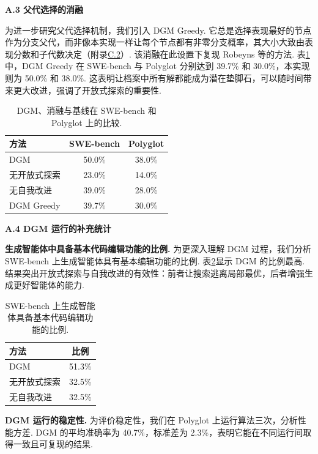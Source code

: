 \noindent\textbf{A.3 父代选择的消融}\label{dgm-app:parent-ablation}\par
为进一步研究父代选择机制，我们引入 DGM Greedy. 它总是选择表现最好的节点作为分支父代，而非像本实现一样让每个节点都有非零分支概率，其大小大致由表现分数和子代数决定（附录\hyperref[dgm-app:parent-select]{C.2}）. 该消融在此设置下复现 Robeyns 等\cite{dgm-robeyns2025self}的方法. 表\ref{dgm-tab:DGM-greedy}中，DGM Greedy 在 SWE-bench 与 Polyglot 分别达到 39.7\% 和 30.0\%，本实现则为 50.0\% 和 38.0\%. 这表明让档案中所有解都能成为潜在垫脚石，可以随时间带来更大改进，强调了开放式探索的重要性.
\begin{table}[ht]
\centering\caption{DGM、消融与基线在 SWE-bench 和 Polyglot 上的比较.}\label{dgm-tab:DGM-greedy}
\begin{tabular}{lcc}\toprule
方法&SWE-bench&Polyglot\\\midrule
DGM&50.0\%&38.0\%\\
无开放式探索&23.0\%&14.0\%\\
无自我改进&39.0\%&28.0\%\\
DGM Greedy&39.7\%&30.0\%\\\bottomrule
\end{tabular}
\end{table}

\noindent\textbf{A.4 DGM 运行的补充统计}\label{dgm-app:additional-statistics}\par
\textbf{生成智能体中具备基本代码编辑功能的比例.} 为更深入理解 DGM 过程，我们分析 SWE-bench 上生成智能体具有基本编辑功能的比例. 表\ref{dgm-tab:code_editing}显示 DGM 的比例最高. 结果突出开放式探索与自我改进的有效性：前者让搜索逃离局部最优，后者增强生成更好智能体的能力.
\begin{table}[ht]
\centering\caption{SWE-bench 上生成智能体具备基本代码编辑功能的比例.}\label{dgm-tab:code_editing}
\begin{tabular}{lc}\toprule 方法&比例\\\midrule
DGM&51.3\%\\无开放式探索&32.5\%\\无自我改进&32.5\%\\\bottomrule\end{tabular}
\end{table}
\textbf{DGM 运行的稳定性.} 为评价稳定性，我们在 Polyglot 上运行算法三次，分析性能方差. DGM 的平均准确率为 40.7\%，标准差为 2.3\%，表明它能在不同运行间取得一致且可复现的结果.


